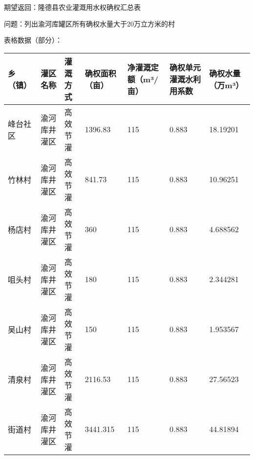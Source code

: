 期望返回：隆德县农业灌溉用水权确权汇总表

问题：列出渝河库罐区所有确权水量大于20万立方米的村

表格数据（部分）：

\begin{table}[htbp]
    \centering
    \footnotesize
    \begin{tabular}{p{1.5cm}p{1.5cm}p{1.5cm}p{1.5cm}p{1.5cm}p{1.5cm}p{1.5cm}}
    \toprule
    \textbf{乡（镇）} & \textbf{灌区名称} & \textbf{灌溉方式} & \textbf{确权面积（亩）} & \textbf{净灌溉定额（m³/亩）} & \textbf{确权单元灌溉水利用系数} & \textbf{确权水量（万m³）} \\
    \midrule
    峰台社区 & 渝河库井灌区 & 高效节灌 & 1396.83 & 115 & 0.883 & 18.19201 \\
    竹林村 & 渝河库井灌区 & 高效节灌 & 841.73 & 115 & 0.883 & 10.96251 \\
    杨店村 & 渝河库井灌区 & 高效节灌 & 360 & 115 & 0.883 & 4.688562 \\
    咀头村 & 渝河库井灌区 & 高效节灌 & 180 & 115 & 0.883 & 2.344281 \\
    吴山村 & 渝河库井灌区 & 高效节灌 & 150 & 115 & 0.883 & 1.953567 \\
    清泉村 & 渝河库井灌区 & 高效节灌 & 2116.53 & 115 & 0.883 & 27.56523 \\
    街道村 & 渝河库井灌区 & 高效节灌 & 3441.315 & 115 & 0.883 & 44.81894 \\

\end{tabular}
\end{table}
